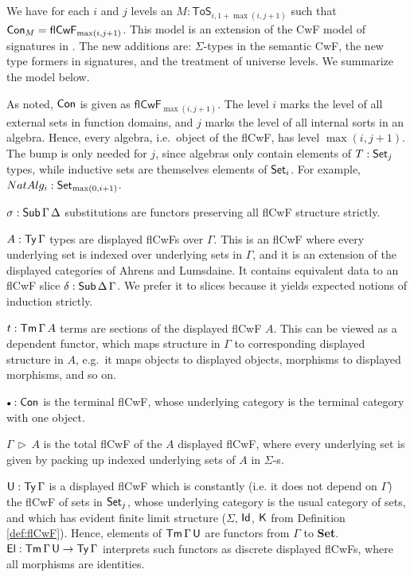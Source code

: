 \documentclass{llncs}
\newcommand{\ToS}{\mathsf{ToS}}
\newcommand{\ext}{\triangleright}
\newcommand{\emptycon}{\scaleobj{.75}\bullet}
\newcommand{\Sg}{\mathsf{\Sigma}}
\newcommand{\flCwF}{\mathsf{flCwF}}
\begin{document}
\begin{nidefinition} We have for each $i$ and $j$ levels
an $M : \ToS_{i, 1+\max(i,j+1)}$ such that $\Con_M = \flCwF_{\max(i,j+1)}$. This
model is an extension of the CwF model of signatures in \cite{TODO}. The new
additions are: $\Sigma$-types in the semantic CwF, the new type formers in
signatures, and the treatment of universe levels. We summarize the model below.

As noted, $\mathsf{Con}$ is given as $\flCwF_{\max(i,j+1)}$. The level $i$ marks the
level of all external sets in function domains, and $j$ marks the level of all
internal sorts in an algebra. Hence, every algebra, i.e.\ object of the flCwF,
has level $\max(i,j+1)$. The bump is only needed for $j$, since algebras only
contain elements of $T : \mathsf{Set}_j$ types, while inductive sets are themselves
elements of $\mathsf{Set}_i$. For example, $NatAlg_i : \mathsf{Set}_{\max(0, i+1)}$.

$\sigma : \mathsf{Sub}\,\Gamma\,\Delta$ substitutions are functors preserving all flCwF
structure strictly.

$A : \mathsf{Ty}\,\Gamma$ types are displayed flCwFs over $\Gamma$. This is an
flCwF where every underlying set is indexed over underlying sets in
$\Gamma$, and it is an extension of the displayed categories of Ahrens and
Lumsdaine\cite{TODO}.  It contains equivalent data to an flCwF slice
$\delta : \mathsf{Sub}\,\Delta\,\Gamma$. We prefer it to slices because it yields
expected notions of induction strictly.

$t : \mathsf{Tm}\,\Gamma\,A$ terms are sections of the displayed flCwF $A$. This can
be viewed as a dependent functor, which maps structure in $\Gamma$ to
corresponding displayed structure in $A$, e.g.\ it maps objects to displayed
objects, morphisms to displayed morphisms, and so on.

$\emptycon : \Con$ is the terminal flCwF, whose underlying category is the
terminal category with one object.

$\Gamma\,\ext\,A$ is the total flCwF of the $A$ displayed flCwF, where every
underlying set is given by packing up indexed underlying sets of $A$ in
$\Sigma$-s.

$\mathsf{U} : \mathsf{Ty}\,\Gamma$ is a displayed flCwF which is constantly (i.e. it does not
depend on $\Gamma$) the flCwF of sets in $\mathsf{Set}_j$, whose underlying category
is the usual category of sets, and which has evident finite limit structure
($\Sg$, $\mathsf{Id}$, $\mathsf{K}$ from Definition \ref{def:flCwF}). Hence, elements of
$\mathsf{Tm}\,\Gamma\,\mathsf{U}$ are functors from $\Gamma$ to \textbf{Set}. $\mathsf{El} :
\mathsf{Tm}\,\Gamma\,\mathsf{U}\rightarrow\mathsf{Ty}\,\Gamma$ interprets such functors as discrete displayed
flCwFs, where all morphisms are identities.


\end{nidefinition}
\end{document}
